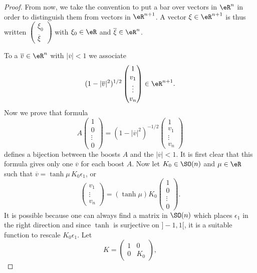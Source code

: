 \begin{proof}
From now, we take the convention to put a bar over vectors in $\eR^n$ in order to distinguish them from vectors in $\eR^{n+1}$. A vector $\xi\in\eR^{n+1}$ is thus written
$
\begin{pmatrix}
\xi_0\\\overline{ \xi }
\end{pmatrix}
$ with $\xi_0\in\eR$ and $\overline{ \xi }\in\eR^n$.

To a $\overline{ v }\in\eR^n$ with $| \overline{ v } |<1$ we associate
\[ 
  (1-| \overline{ v } |^2)^{1/2}
\begin{pmatrix}
1\\v_1\\\vdots\\v_n
\end{pmatrix}
\in\eR^{n+1}.
\]
Now we prove that formula
\begin{equation}
A
\begin{pmatrix}
1\\0\\\vdots\\0
\end{pmatrix}
=(1-|\overline{ v }|^2)^{-1/2}
\begin{pmatrix}
1\\v_1\\\vdots \\v_n
\end{pmatrix}
\end{equation}
defines a bijection between the boosts $A$ and the $|\overline{ v }|<1$. It is first clear that this formula gives only one $\overline{v}$ for each boost $A$. Now let $K_0\in \SO(n)$ and $\mu\in\eR$ such that $\overline{v}=\tanh\mu\,K_0\epsilon_1$, or
\[ 
\begin{pmatrix}
v_1\\\vdots\\v_n
\end{pmatrix}
=
(\tanh\mu)K_0
\begin{pmatrix}
1\\0\\\vdots\\0
\end{pmatrix}.
\]
It is possible because one can always find a matrix in $\SO(n)$ which places $\epsilon_1$ in the right direction and since $\tanh$ is surjective on $]-1,1[$, it is a suitable function to rescale $K_0\epsilon_1$. Let
\[ 
  K=
\begin{pmatrix}
1&0\\0&K_0
\end{pmatrix},
\]
\end{proof}
